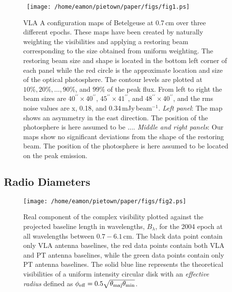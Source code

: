 \documentclass[iop]{emulateapj}
\begin{document}
\begin{figure*}
\mbox{
\texttt{[image: /home/eamon/pietown/paper/figs/fig1.ps]}
}
\caption{VLA A configuration maps of Betelgeuse at 0.7\,cm over three different epochs. These maps have been created by naturally weighting the visibilities and applying a restoring beam corresponding to the size obtained from uniform weighting. The restoring beam size and shape is located in the bottom left corner of each panel while the red circle is the approximate location and size of the optical photosphere. The contour levels are plotted at $10\%, 20\%,\dots ,90\%$, and $99\%$ of the peak flux. From left to right the beam sizes are $40^{\prime\prime}\times 40^{\prime\prime}$, $45^{\prime\prime}\times 41^{\prime\prime}$, and $48^{\prime\prime}\times 40^{\prime\prime}$, and the rms noise values are x, 0.18, and 0.34\,mJy\,beam$^{-1}$. \textit{Left panel}: The \cite{lim_1998} map shows an asymmetry in the east direction. The position of the photosphere is here assumed to be .... \textit{Middle and right panels}: Our maps show no significant deviations from the shape of the restoring beam. The position of the photosphere is here assumed to be located on the peak emission.}
\label{fig1}
\end{figure*}

\subsection{Radio Diameters} 

\begin{figure}
\texttt{[image: /home/eamon/pietown/paper/figs/fig2.ps]}
\caption{Real component of the complex visibility plotted against the projected baseline length in wavelengths, $B_{\lambda}$, for the 2004 epoch at all wavelengths between $0.7-6.1$\,cm. The black data point contain only VLA antenna baselines, the red data points contain both VLA and PT antenna baselines, while the green data points contain only PT antenna baselines. The solid blue line represents the theoretical visibilities of a uniform intensity circular disk with an \textit{effective radius} defined as $\phi _{\rm{eff}}=0.5\sqrt{\theta _{\rm{maj}}\theta _{\rm{min}}}$.}
\label{fig2}
\end{figure}
\end{document}
